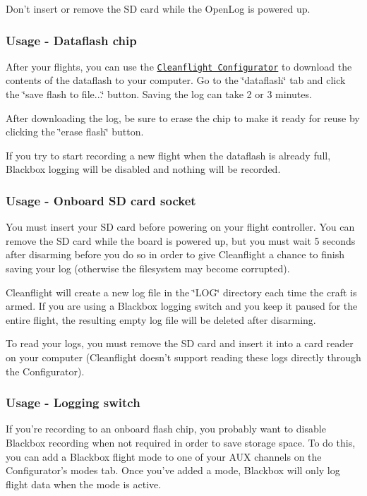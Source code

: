 Don't insert or remove the S\+D card while the Open\+Log is powered up.

\subsubsection*{Usage -\/ Dataflash chip}

After your flights, you can use the \href{https://chrome.google.com/webstore/detail/cleanflight-configurator/enacoimjcgeinfnnnpajinjgmkahmfgb?hl=en}{\tt Cleanflight Configurator} to download the contents of the dataflash to your computer. Go to the \char`\"{}dataflash\char`\"{} tab and click the \char`\"{}save flash to file...\char`\"{} button. Saving the log can take 2 or 3 minutes.



After downloading the log, be sure to erase the chip to make it ready for reuse by clicking the \char`\"{}erase flash\char`\"{} button.

If you try to start recording a new flight when the dataflash is already full, Blackbox logging will be disabled and nothing will be recorded.

\subsubsection*{Usage -\/ Onboard S\+D card socket}

You must insert your S\+D card before powering on your flight controller. You can remove the S\+D card while the board is powered up, but you must wait 5 seconds after disarming before you do so in order to give Cleanflight a chance to finish saving your log (otherwise the filesystem may become corrupted).

Cleanflight will create a new log file in the \char`\"{}\+L\+O\+G\char`\"{} directory each time the craft is armed. If you are using a Blackbox logging switch and you keep it paused for the entire flight, the resulting empty log file will be deleted after disarming.

To read your logs, you must remove the S\+D card and insert it into a card reader on your computer (Cleanflight doesn't support reading these logs directly through the Configurator).

\subsubsection*{Usage -\/ Logging switch}

If you're recording to an onboard flash chip, you probably want to disable Blackbox recording when not required in order to save storage space. To do this, you can add a Blackbox flight mode to one of your A\+U\+X channels on the Configurator's modes tab. Once you've added a mode, Blackbox will only log flight data when the mode is active.

